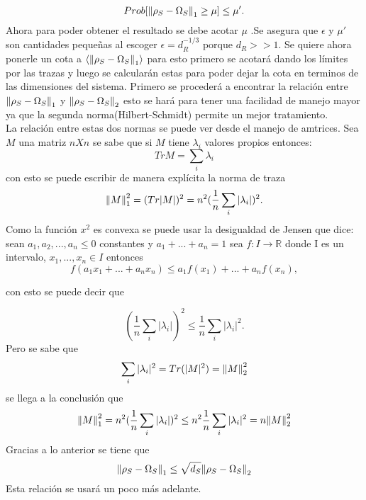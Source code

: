 \begin{equation}
Prob[\norm{\rho_{S} -\Omega_{S}}_{1} \ge \mu] \le \mu'.
\end{equation}
Ahora para poder obtener el resultado se debe acotar $\mu$ .Se asegura que $\epsilon$ y $\mu'$ son cantidades pequeñas al escoger $\epsilon=d_{R}^{-1/3}$ porque $d_{R}>>1$. Se quiere ahora ponerle un cota a $\langle \norm{\rho_{S} -\Omega_{S}}_{1} \rangle$ para esto primero se acotará dando los límites por las trazas y luego se calcularán estas para poder dejar la cota en terminos de las dimensiones del sistema. Primero se procederá a encontrar la relación entre $\norm{\rho_{S} -\Omega_{S}}_{1}$ y $\norm{\rho_{S} -\Omega_{S}}_{2}$ esto se hará para tener una facilidad de manejo mayor ya que la segunda norma(Hilbert-Schmidt) permite un mejor tratamiento.\\
La relación entre estas dos normas se puede ver desde el manejo de amtrices. Sea $M$ una matriz $nX	n$ se sabe que si $M$ tiene $\lambda_{i}$ valores propios entonces:
\begin{equation}
Tr M= \sum_{i} \lambda_{i} 
\end{equation}
con esto se puede escribir de manera explícita la norma de traza 
\begin{equation}
\norm{M}_{1}^2=(Tr|M|)^{2}=n^{2} (\frac{1}{n}\sum_{i} |\lambda_{i}|)^{2}.
\end{equation}
Como la función $x^{2}$ es convexa se puede usar la desigualdad de Jensen que dice: sean $a_{1},a_{2},...,a_{n} \le 0$ constantes y $a_{1} +...+a_{n}=1$ sea $f: I \to \mathbb{R}$ donde I es un intervalo, $x_{1},...,x_{n} \in I$ entonces
\begin{equation}
f(a_{1}x_{1}+...+a_{n}x_{n}) \le a_{1}f(x_{1})+...+a_{n}f(x_{n}),
\end{equation}

con esto se puede decir que

\begin{equation}
(\frac{1}{n}\sum_{i} |\lambda_{i}|)^{2} \le \frac{1}{n}\sum_{i} |\lambda_{i}|^{2}.
\end{equation}
Pero se sabe que 
\begin{equation}
\sum_{i} |\lambda_{i}|^2=Tr(|M|^2)=\norm{M}_{2}^{2}
\end{equation}
se llega a la conclusión que 
\begin{equation}
\norm{M}_{1}^{2} = n^{2}(\frac{1}{n} \sum_{i}| \lambda_{i} | )^{2} \le  n^{2} \frac{1}{n} \sum_{i} | \lambda_{i} |^{2}= n\norm{M}_{2}^{2}
\end{equation}
Gracias a lo anterior se tiene que 
\begin{equation}\label{eq:0}
\norm{\rho_{S} - \Omega_{S}}_{1} \le \sqrt{d_{S}}\norm{\rho_{S} - \Omega_{S}}_{2}
\end{equation}
Esta relación se usará un poco más adelante.\\

